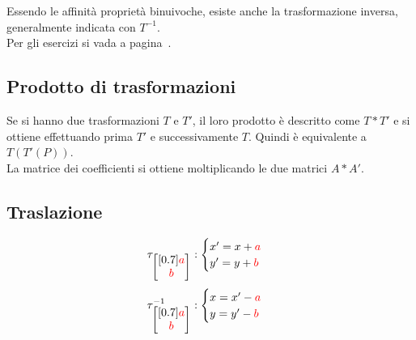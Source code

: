 Essendo le affinità proprietà binuivoche, esiste anche la trasformazione inversa, generalmente 
indicata con $T^{-1}$.\\
Per gli esercizi si vada a pagina~\pageref{ex:aff}.

\subsection{Prodotto di trasformazioni}
Se si hanno due trasformazioni $T$ e $T'$, il loro prodotto è descritto come $T\ast T'$ e si ottiene
effettuando prima $T'$ e successivamente $T$. Quindi è equivalente a $T(T'(P))$.\\
La matrice dei coefficienti si ottiene moltiplicando le due matrici $A\ast A'$.

\subsection{Traslazione}
\begin{center}
\end{center}
\begin{equation*}
  \tau_{\begin{bmatrix}[0.7]
      \mathcolor{red}{a}\\\mathcolor{red}{b}
  \end{bmatrix}}:
  \begin{cases}
    x'= x+\mathcolor{red}{a}\\
    y'= y+\mathcolor{red}{b}
  \end{cases}
\end{equation*}
\begin{equation*}
  \tau_{\begin{bmatrix}[0.7]
      \mathcolor{red}{a}\\\mathcolor{red}{b}
  \end{bmatrix}}^{-1}:
  \begin{cases}
    x = x'-\mathcolor{red}{a}\\
    y = y'-\mathcolor{red}{b}
  \end{cases}
\end{equation*}

